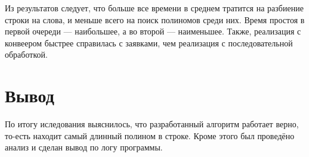 Из результатов следует, что больше все времени в среднем тратится на разбиение строки на слова, и меньше всего на поиск полиномов среди них. Время простоя в первой очереди --- наибольшее, а во второй --- наименьшее. Также, реализация с конвеером быстрее справилась с заявками, чем реализация с последовательной обработкой.

\newpage
\section{Вывод}
По итогу иследования выяснилось, что разработанный алгоритм работает верно, то-есть находит самый длинный полином в строке. Кроме этого был проведёно анализ и сделан вывод по логу программы.